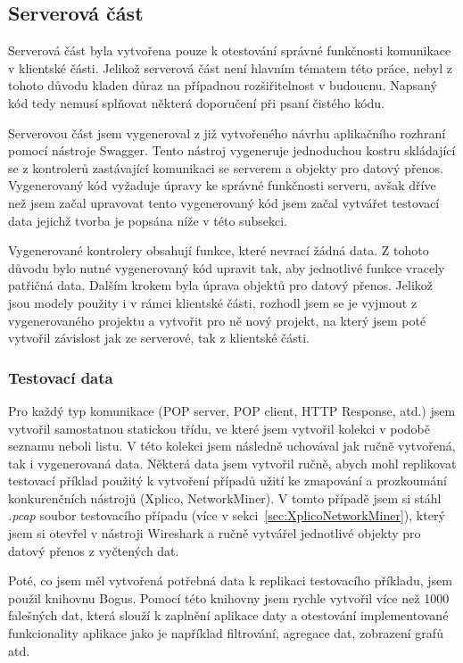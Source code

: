     
    \subsection{Serverová část}
        Serverová část byla vytvořena pouze k otestování správné funkčnosti komunikace v klientské části. Jelikož serverová část není hlavním tématem této práce, nebyl z tohoto důvodu kladen důraz na případnou rozšiřitelnost v budoucnu. Napsaný kód tedy nemusí splňovat některá doporučení při psaní čistého kódu. 

        Serverovou část jsem vygeneroval z již vytvořeného návrhu aplikačního rozhraní pomocí nástroje Swagger. Tento nástroj vygeneruje jednoduchou kostru skládající se z kontrolerů zastávající komunikaci se serverem a objekty pro datový přenos. Vygenerovaný kód vyžaduje úpravy ke správné funkčnosti serveru, avšak dříve než jsem začal upravovat tento vygenerovaný kód jsem začal vytvářet testovací data jejichž tvorba je popsána níže v této subsekci.
                
        Vygenerované kontrolery obsahují funkce, které nevrací žádná data. Z tohoto důvodu bylo nutné vygenerovaný kód upravit tak, aby jednotlivé funkce vracely patřičná data. Dalším krokem byla úprava objektů pro datový přenos. Jelikož jsou modely použity i v rámci klientské části, rozhodl jsem se je vyjmout z vygenerovaného projektu a vytvořit pro ně nový projekt, na který jsem poté vytvořil závislost jak ze serverové, tak z klientské části.

        \subsubsection*{Testovací data}
            Pro každý typ komunikace (\gls{POP} server, \gls{POP} client, \gls{HTTP} Response, atd.) jsem vytvořil samostatnou statickou třídu, ve které jsem vytvořil kolekci v podobě seznamu neboli listu. V této kolekci jsem následně uchovával jak ručně vytvořená, tak i vygenerovaná data. Některá data jsem vytvořil ručně, abych mohl replikovat testovací příklad použitý k vytvoření případů užití ke zmapování a prozkoumání konkurenčních nástrojů (Xplico, NetworkMiner). V tomto případě jsem si stáhl \textit{.pcap} soubor testovacího případu (více v sekci~\ref{sec:XplicoNetworkMiner}), který jsem si otevřel v nástroji Wireshark a ručně vytvářel jednotlivé objekty pro datový přenos z vyčtených dat. 
            
            Poté, co jsem měl vytvořená potřebná data k replikaci testovacího příkladu, jsem použil knihovnu Bogus. Pomocí této knihovny jsem rychle vytvořil více než 1000 falešných dat, která slouží k zaplnění aplikace daty a otestování implementované funkcionality aplikace jako je například filtrování, agregace dat, zobrazení grafů atd.
            
